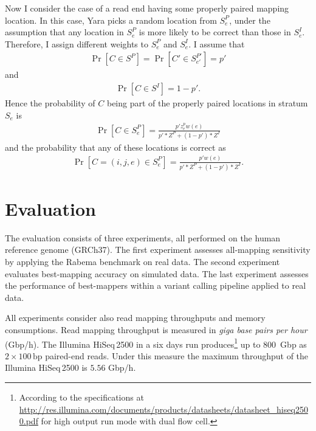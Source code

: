 Now I consider the case of a read end having some properly paired mapping location.
In this case, Yara picks a random location from $S^P_e$, under the assumption that any location in $S^P_e$ is more likely to be correct than those in $S^I_e$.
Therefore, I assign different weights to $S^P_e$ and $S^I_e$.
I assume that
\begin{eqnarray}
\Pr[C \in S^P] = \Pr[C' \in S^{P'}_{e'}] = p'
\end{eqnarray}
and 
\begin{eqnarray}
\Pr[C \in S^I] = 1 - p'.
\end{eqnarray}
Hence the probability of $C$ being part of the properly paired locations in stratum $S_e$ is
\begin{eqnarray}
\label{eq:yara:mqual:se:stratum}
\Pr[C \in S^P_e] = \frac{p' z^p_e w(e)}{p' * Z^P + (1-p') * Z^I}
\end{eqnarray}
and the probability that any of these locations is correct as
\begin{eqnarray}
\label{eq:yara:mqual:se:location}
\Pr[C = (i,j,e) \in S^P_e] = \frac{p' w(e)}{p' * Z^P + (1-p') * Z^I}.
\end{eqnarray}



\section{Evaluation}
\label{sec:yara:eval}

The evaluation consists of three experiments, all performed on the human reference genome (GRCh37).
The first experiment assesses all-mapping sensitivity by applying the Rabema benchmark on real data.
The second experiment evaluates best-mapping accuracy on simulated data.
The last experiment assesses the performance of best-mappers within a variant calling pipeline applied to real data.

All experiments consider also read mapping throughputs and memory consumptions.
Read mapping throughput is measured in \emph{giga base pairs per hour} (Gbp/h).
The Illumina HiSeq\,2500 in a six days run produces\footnote{According to the specifications at \url{http://res.illumina.com/documents/products/datasheets/datasheet_hiseq2500.pdf} for high output run mode with dual flow cell.} up to 800~Gbp as $2 \times 100\,\text{bp}$ paired-end reads.
Under this measure the maximum throughput of the Illumina HiSeq\,2500 is $5.56$ Gbp/h.

